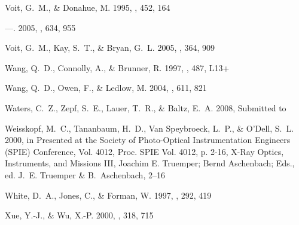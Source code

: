 \documentclass[12pt,preprint]{aastex}
\begin{document}
\begin{thebibliography}{137}
{Voit}, G.~M., \& {Donahue}, M. 1995, \apj, 452, 164

---. 2005, \apj, 634, 955

{Voit}, G.~M., {Kay}, S.~T., \& {Bryan}, G.~L. 2005, \mnras, 364, 909

{Wang}, Q.~D., {Connolly}, A., \& {Brunner}, R. 1997, \apjl, 487, L13+

{Wang}, Q.~D., {Owen}, F., \& {Ledlow}, M. 2004, \apj, 611, 821

{Waters}, C.~Z., {Zepf}, S.~E., {Lauer}, T.~R., \& {Baltz}, E.~A. 2008,
  Submitted to \apj

{Weisskopf}, M.~C., {Tananbaum}, H.~D., {Van Speybroeck}, L.~P., \& {O'Dell},
  S.~L. 2000, in Presented at the Society of Photo-Optical Instrumentation
  Engineers (SPIE) Conference, Vol. 4012, Proc. SPIE Vol. 4012, p. 2-16, X-Ray
  Optics, Instruments, and Missions III, Joachim E. Truemper; Bernd Aschenbach;
  Eds., ed. J.~E. {Truemper} \& B.~{Aschenbach}, 2--16

{White}, D.~A., {Jones}, C., \& {Forman}, W. 1997, \mnras, 292, 419

{Xue}, Y.-J., \& {Wu}, X.-P. 2000, \mnras, 318, 715

\end{thebibliography}








\end{document}
